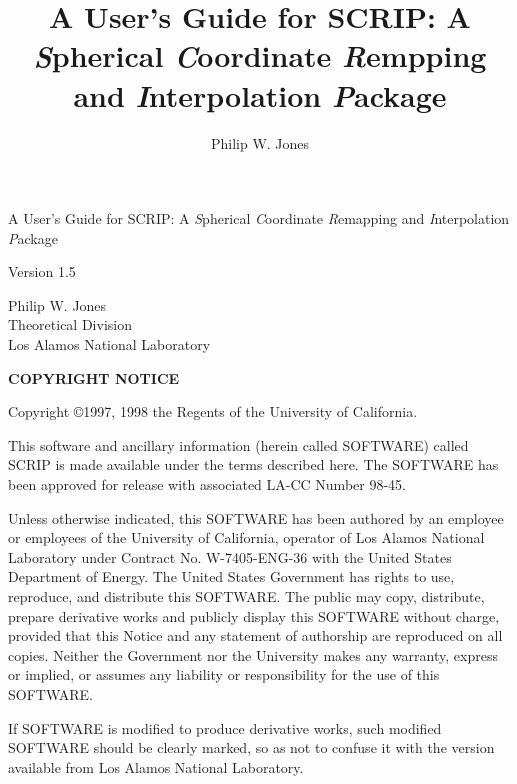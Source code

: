 \documentclass[12pt]{report}
\title{A User's Guide for SCRIP: A {\em S}pherical {\em C}oordinate
       {\em R}empping and {\em I}nterpolation {\em P}ackage }
\author{Philip W. Jones}
\begin{document}

\begin{titlepage}

\vspace{1in}

\begin{center}
{\Large{A User's Guide for SCRIP: A {\em S}pherical {\em C}oordinate
       {\em R}emapping and {\em I}nterpolation {\em P}ackage }}
\end{center}

\vspace{1in}

\begin{center}
Version 1.5
\end{center}

\vspace{1in}

\begin{center}
Philip W. Jones \\
Theoretical Division \\
Los Alamos National Laboratory
\end{center}

\newpage

\begin{center}
{\bf COPYRIGHT NOTICE}
\end{center}

Copyright \copyright 1997, 1998 the Regents of the University of
California.

\vspace{0.5in}

This software and ancillary information (herein called SOFTWARE) called
SCRIP is made available under the terms described here.  The SOFTWARE
has been approved for release with associated LA-CC Number 98-45.

Unless otherwise indicated, this SOFTWARE has been authored by an
employee or employees of the University of California, operator
of Los Alamos National Laboratory under Contract No. W-7405-ENG-36
with the United States Department of Energy.  The United States
Government has rights to use, reproduce, and distribute this
SOFTWARE.  The public may copy, distribute, prepare derivative
works and publicly display this SOFTWARE without charge, provided
that this Notice and any statement of authorship are reproduced
on all copies.  Neither the Government nor the University makes
any warranty, express or implied, or assumes any liability or
responsibility for the use of this SOFTWARE.

If SOFTWARE is modified to produce derivative works, such modified
SOFTWARE should be clearly marked, so as not to confuse it with the
version available from Los Alamos National Laboratory.


\end{titlepage}
\end{document}
